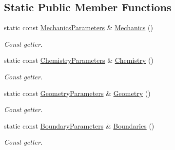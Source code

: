 \subsection*{Static Public Member Functions}
{\bf }\par
\begin{DoxyCompactItemize}
\item 
static const \hyperlink{structMechanicsParameters}{Mechanics\+Parameters} \& \hyperlink{classSystemParameters_a8099e2ebea135ea5d7c7e79d34600f52}{Mechanics} ()
\begin{DoxyCompactList}\small\item\em Const getter. \end{DoxyCompactList}\item 
static const \hyperlink{structChemistryParameters}{Chemistry\+Parameters} \& \hyperlink{classSystemParameters_a05c9527eb94d2cf4f164de3ef09afc4b}{Chemistry} ()
\begin{DoxyCompactList}\small\item\em Const getter. \end{DoxyCompactList}\item 
static const \hyperlink{structGeometryParameters}{Geometry\+Parameters} \& \hyperlink{classSystemParameters_a9211bca7e3422c076f4e9ba2dc29c599}{Geometry} ()
\begin{DoxyCompactList}\small\item\em Const getter. \end{DoxyCompactList}\item 
static const \hyperlink{structBoundaryParameters}{Boundary\+Parameters} \& \hyperlink{classSystemParameters_a6e73fd102a3699c854d9e503c1b75fc1}{Boundaries} ()
\begin{DoxyCompactList}\small\item\em Const getter. \end{DoxyCompactList}\end{DoxyCompactItemize}

